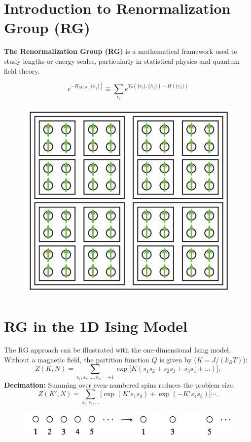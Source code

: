 \documentclass{antclass}
\begin{document}
\section{Introduction to Renormalization Group (RG)}

\textbf{The Renormalization Group (RG)} is a mathematical framework used to study lengths or energy scales, particularly in statistical physics and quantum field theory.

\begin{equation}
e^{-H_{\text{RG}, \theta}[\{h_j\}]} \equiv \sum_{v_i}e^{T_\theta(\{v_i\}, \{h_j\}) - H(\{v_i\})}
\end{equation}

\begin{figure}
    \centering
    \includegraphics[width=0.55\linewidth]{pics/Renormalization/BlockSpin.png}
\end{figure}

\pagebreak

\section{RG in the 1D Ising Model}

The RG approach can be illustrated with the one-dimensional Ising model. Without a magnetic field, the partition function $Q$ is given by
($K = J / (k_B T)$):\begin{equation}
Z(K, N) = \sum_{s_1, s_2, \dots, s_N = \pm 1} \exp \big[ K(s_1s_2 + s_2s_3 + s_3s_4 + \dots) \big],
\end{equation}
\textbf{Decimation:} Summing over even-numbered spins reduces the problem size.
\begin{equation}
Z(K', N) = \sum_{s_1, s_3, \dots} \big[ \exp(K' s_1 s_3) + \exp(-K' s_1 s_3) \big] \cdots.
\end{equation}
\begin{figure}
    \centering
    \includegraphics[width=0.90\linewidth]{pics/Renormalization/SumOverEven.png}
\end{figure}
\end{document}
